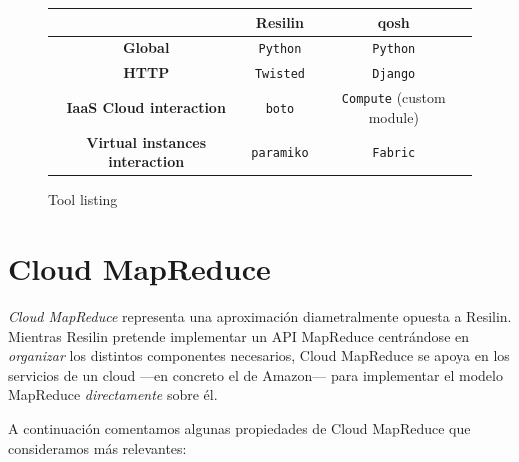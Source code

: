 \begin{figure}[tbp]
\begin{center}
\begin{tabular}{|c|c|c|}
\hline
& \textbf{Resilin} & \textbf{qosh} \\
\hline
\textbf{Global} & \texttt{Python} & \texttt{Python} \\
\hline
\textbf{HTTP} & \texttt{Twisted} & \texttt{Django} \\
\hline
\textbf{IaaS Cloud interaction} & \texttt{boto} & \texttt{Compute} (custom module) \\
\hline
\textbf{Virtual instances interaction} & \texttt{paramiko} & \texttt{Fabric} \\
\hline
\end{tabular}
\caption{Tool listing}
\label{fig:resilinproyecto}
\end{center}
\end{figure}

\section{Cloud MapReduce}\label{sec:cloudmapred}
\noindent \emph{Cloud MapReduce} representa una aproximaci\'on diametralmente opuesta a Resilin. Mientras Resilin pretende implementar un API MapReduce centr\'andose en \emph{organizar} los distintos componentes necesarios, Cloud MapReduce se apoya en los servicios de un cloud ---en concreto el de Amazon--- para implementar el modelo MapReduce \cite{googlemapreduce} \emph{directamente} sobre \'el.\newline

A continuaci\'on comentamos algunas propiedades de Cloud MapReduce que consideramos m\'as relevantes:

